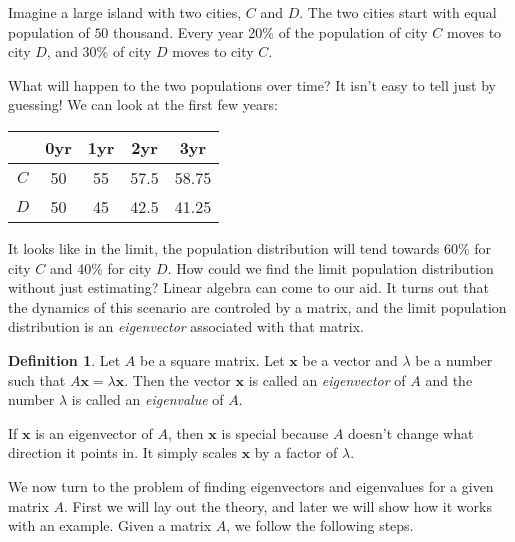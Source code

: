 \documentclass[11pt,oneside]{amsbook}
\theoremstyle{definition}
\theoremstyle{plain}
\theoremstyle{definition}
\newtheorem{definition}[theorem]{Definition}
\theoremstyle{remark}
\numberwithin{equation}{section}
\numberwithin{figure}{section}
\begin{document}
Imagine a large island with two cities, $C$ and $D$. The two cities start with equal population of $50$ thousand. Every year 20\% of the population of city $C$ moves to city $D$, and 30\% of city $D$ moves to city $C$.
\begin{center}
\end{center}
What will happen to the two populations over time? It isn't easy to tell just by guessing! We can look at the first few years:
\begin{center}
  \begin{tabular}{ccccc}
     & 0yr & 1yr & 2yr & 3yr \\\hline
    $C$ & 50 & 55 & 57.5 & 58.75 \\
    $D$ & 50 & 45 & 42.5 & 41.25
  \end{tabular}
\end{center}
It looks like in the limit, the population distribution will tend towards 60\% for city $C$ and 40\% for city $D$. How could we find the limit population distribution without just estimating? Linear algebra can come to our aid. It turns out that the dynamics of this scenario are controled by a matrix, and the limit population distribution is an \emph{eigenvector} associated with that matrix.

\begin{definition}
  Let $A$ be a square matrix. Let $\bm{x}$ be a vector and $\lambda$ be a number such that $A\bm{x}=\lambda\bm{x}$. Then the vector $\bm x$ is called an \emph{eigenvector} of $A$ and the number $\lambda$ is called an \emph{eigenvalue} of $A$.
\end{definition}

If $\bm{x}$ is an eigenvector of $A$, then $\bm{x}$ is special because $A$ doesn't change what direction it points in. It simply scales $\bm{x}$ by a factor of $\lambda$.

We now turn to the problem of finding eigenvectors and eigenvalues for a given matrix $A$. First we will lay out the theory, and later we will show how it works with an example. Given a matrix $A$, we follow the following steps.
\end{document}
